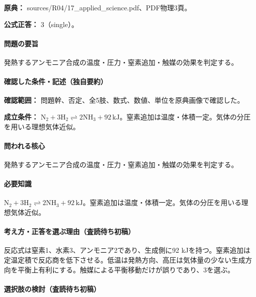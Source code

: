\noindent\textbf{原典：} sources/R04/17\_applied\_science.pdf、PDF物理3頁。

\textbf{公式正答：} 3（single）。

\paragraph{問題の要旨} 発熱するアンモニア合成の温度・圧力・窒素追加・触媒の効果を判定する。

\paragraph{確認した条件・記述（独自要約）}\mbox{}\par

\noindent\textbf{確認範囲：} 問題幹、否定、全5肢、数式、数値、単位を原典画像で確認した。\par

\noindent\textbf{成立条件：} \(\mathrm{N_2+3H_2\rightleftharpoons2NH_3}+92\,\mathrm{kJ}\)。窒素追加は温度・体積一定。気体の分圧を用いる理想気体近似。\par

\paragraph{問われる核心} 発熱するアンモニア合成の温度・圧力・窒素追加・触媒の効果を判定する。

\paragraph{必要知識} \(\mathrm{N_2+3H_2\rightleftharpoons2NH_3}+92\,\mathrm{kJ}\)。窒素追加は温度・体積一定。気体の分圧を用いる理想気体近似。

\paragraph{考え方・正答を選ぶ理由（査読待ち初稿）} 反応式は窒素1、水素3、アンモニア2であり、生成側に92 kJを持つ。窒素追加は定温定積で反応商を低下させる。低温は発熱方向、高圧は気体量の少ない生成方向を平衡上有利にする。触媒による平衡移動だけが誤りであり、3を選ぶ。

\paragraph{選択肢の検討（査読待ち初稿）}\mbox{}\par

